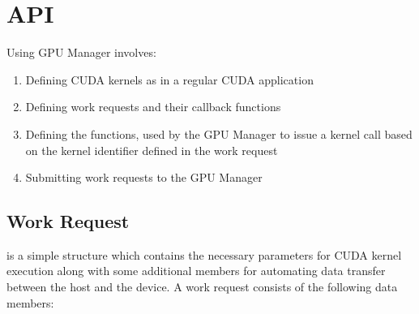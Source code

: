 \documentclass[10pt]{report}
\begin{document}
\section{API}

Using GPU Manager involves:
\begin{enumerate}
\item Defining CUDA kernels as in a regular CUDA application
\item Defining work requests and their callback functions
\item Defining the  functions, used by the GPU Manager to issue a kernel call based on the kernel identifier defined in the work request
\item Submitting work requests to the GPU Manager
\end{enumerate}

\subsection{Work Request}
 is a simple structure which contains the necessary parameters
for CUDA kernel execution along with some additional members for automating
data transfer between the host and the device.
A work request consists of the following data members:
\end{document}

